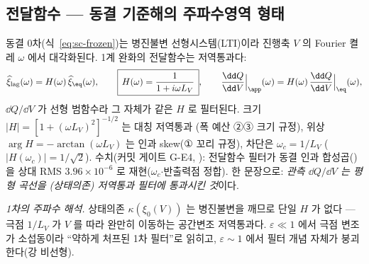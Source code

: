 \subsection{전달함수 --- 동결 기준해의 주파수영역 형태}\label{sec:sc-transfer}
동결 0차(식~\eqref{eq:sc-frozen})는 병진불변 선형시스템(LTI)이라 진행축 $V$ 의 Fourier 켤레 $\omega$ 에서 대각화된다.
1계 완화의 전달함수는 저역통과다:
\begin{equation}
\widehat{\xi}_{\mathrm{lag}}(\omega)=H(\omega)\,\widehat{\xi}_{\eq}(\omega),\qquad
\boxed{\,H(\omega)=\frac1{1+i\omega L_V}\,},\qquad
\frac{\dd Q}{\dd V}\Big|_{\app}(\omega)=H(\omega)\,\frac{\dd Q}{\dd V}\Big|_{\eq}(\omega),
\label{eq:sc-transfer}
\end{equation}
$\dd Q/\dd V$ 가 선형 범함수라 그 자체가 같은 $H$ 로 필터된다. 크기 $|H|=[1+(\omega L_V)^2]^{-1/2}$ 는 대칭 저역통과
(폭 예산 ②③ 크기 규정), 위상 $\arg H=-\arctan(\omega L_V)$ 는 인과 skew(① 꼬리 규정), 차단은 $\omega_c=1/L_V$
($|H(\omega_c)|=1/\sqrt2$). 수치(커밋 게이트 G-E4, ): 전달함수 필터가 동결
인과 합성곱()을 상대 RMS $3.96\times10^{-6}$ 로 재현($\omega_c$$\cdot$반출력점 정합).
한 문장으로: \emph{관측 $\dd Q/\dd V$ 는 평형 곡선을 (상태의존) 저역통과 필터에 통과시킨 것}이다.

\emph{1차의 주파수 해석.} 상태의존 $\kappa(\xi_0(V))$ 는 병진불변을 깨므로 단일 $H$ 가 없다 --- 극점 $1/L_V$ 가
$V$ 를 따라 완만히 이동하는 공간변조 저역통과다. $\varepsilon\ll1$ 에서 극점 변조가 소섭동이라 ``약하게 처프된 1차
필터''로 읽히고, $\varepsilon\sim1$ 에서 필터 개념 자체가 붕괴한다(강 비선형).

